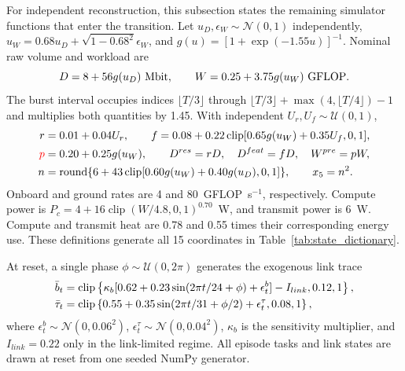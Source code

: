 \documentclass[11pt]{article}
\DeclareMathOperator{\clip}{clip}
\begin{document}
For independent reconstruction, this subsection states the remaining simulator functions that enter the transition. Let $u_D,\epsilon_W\sim\mathcal N(0,1)$ independently, $u_W=0.68u_D+\sqrt{1-0.68^2}\epsilon_W$, and $g(u)=[1+\exp(-1.55u)]^{-1}$. Nominal raw volume and workload are
\begin{equation}
D=8+56g(u_D)\ {\rm Mbit},\qquad W=0.25+3.75g(u_W)\ {\rm GFLOP}.
\label{eq:primitive_generator}
\end{equation}
The burst interval occupies indices $\lfloor T/3\rfloor$ through $\lfloor T/3\rfloor+\max(4,\lfloor T/4\rfloor)-1$ and multiplies both quantities by 1.45. With independent $U_r,U_f\sim\mathcal U(0,1)$,
\begin{align}
r&=0.01+0.04U_r,\qquad f=0.08+0.22\clip[0.65g(u_W)+0.35U_f,0,1],\notag\\
\color{red}%
p&=0.20+0.25g(u_W),\qquad D^{res}=rD,\quad D^{feat}=fD,\quad W^{pre}=pW,\notag\\
n&=\operatorname{round}\{6+43\clip[0.60g(u_W)+0.40g(u_D),0,1]\},\qquad x_5=n^2.
\color{black}%
\label{eq:primitive_ratios}
\end{align}
Onboard and ground rates are 4 and 80~GFLOP~s$^{-1}$, respectively. Compute power is $P_c=4+16\clip(W/4.8,0,1)^{0.70}$~W, and transmit power is 6~W. Compute and transmit heat are 0.78 and 0.55 times their corresponding energy use. These definitions generate all 15 coordinates in Table~\ref{tab:state_dictionary}.

At reset, a single phase $\phi\sim\mathcal U(0,2\pi)$ generates the exogenous link trace
\begin{align}
\bar b_t&=\clip\left\{\kappa_b[0.62+0.23\sin(2\pi t/24+\phi)+\epsilon^b_t]-I_{link},0.12,1\right\},\notag\\
\bar\tau_t&=\clip\left\{0.55+0.35\sin(2\pi t/31+\phi/2)+\epsilon^\tau_t,0.08,1\right\},
\label{eq:link_trace}
\end{align}
where $\epsilon^b_t\sim\mathcal N(0,0.06^2)$, $\epsilon^\tau_t\sim\mathcal N(0,0.04^2)$, $\kappa_b$ is the sensitivity multiplier, and $I_{link}=0.22$ only in the link-limited regime. All episode tasks and link states are drawn at reset from one seeded NumPy generator.
\end{document}
